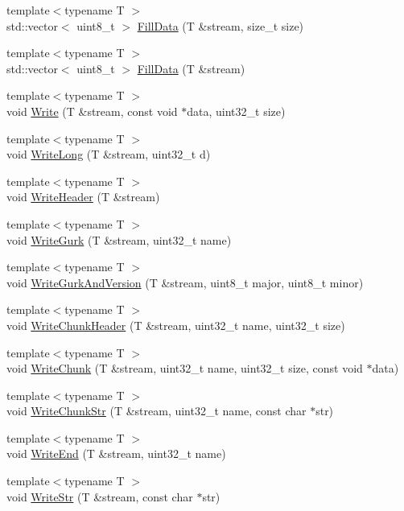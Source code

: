 \begin{DoxyCompactItemize}
{\footnotesize template$<$typename T $>$ }\\std\-::vector$<$ uint8\-\_\-t $>$ \hyperlink{a00206_a2423540a85dd87357f51ee35280914d9}{Fill\-Data} (T \&stream, size\-\_\-t size)
\item 
{\footnotesize template$<$typename T $>$ }\\std\-::vector$<$ uint8\-\_\-t $>$ \hyperlink{a00206_a81b44e337e34cce3a072ed9ef4e6e0bf}{Fill\-Data} (T \&stream)
\item 
{\footnotesize template$<$typename T $>$ }\\void \hyperlink{a00206_aa6d6ac41fdb09ad39108ff3991d6702d}{Write} (T \&stream, const void $\ast$data, uint32\-\_\-t size)
\item 
{\footnotesize template$<$typename T $>$ }\\void \hyperlink{a00206_a9ef68a96928d4fd243d40f9e1893e09c}{Write\-Long} (T \&stream, uint32\-\_\-t d)
\item 
{\footnotesize template$<$typename T $>$ }\\void \hyperlink{a00206_a7666a08192fd141a834fe3c72ad9706d}{Write\-Header} (T \&stream)
\item 
{\footnotesize template$<$typename T $>$ }\\void \hyperlink{a00206_ad4e7d26753379ac3886be7c07c2abd3d}{Write\-Gurk} (T \&stream, uint32\-\_\-t name)
\item 
{\footnotesize template$<$typename T $>$ }\\void \hyperlink{a00206_a52056aed621e1f0c1c893c33ecf5ed76}{Write\-Gurk\-And\-Version} (T \&stream, uint8\-\_\-t major, uint8\-\_\-t minor)
\item 
{\footnotesize template$<$typename T $>$ }\\void \hyperlink{a00206_a334e26ddd05461f2454aa01d0a2f368f}{Write\-Chunk\-Header} (T \&stream, uint32\-\_\-t name, uint32\-\_\-t size)
\item 
{\footnotesize template$<$typename T $>$ }\\void \hyperlink{a00206_ab0cc8c9498eec2c655089f150fa8766d}{Write\-Chunk} (T \&stream, uint32\-\_\-t name, uint32\-\_\-t size, const void $\ast$data)
\item 
{\footnotesize template$<$typename T $>$ }\\void \hyperlink{a00206_a8dd409d515d2c2eeaa50abc05e1df523}{Write\-Chunk\-Str} (T \&stream, uint32\-\_\-t name, const char $\ast$str)
\item 
{\footnotesize template$<$typename T $>$ }\\void \hyperlink{a00206_a6c5a2580717ba4088169bd3754727b4b}{Write\-End} (T \&stream, uint32\-\_\-t name)
\item 
{\footnotesize template$<$typename T $>$ }\\void \hyperlink{a00206_a0177a26c60cef1b910cddb8a2773a34b}{Write\-Str} (T \&stream, const char $\ast$str)
\end{DoxyCompactItemize}


